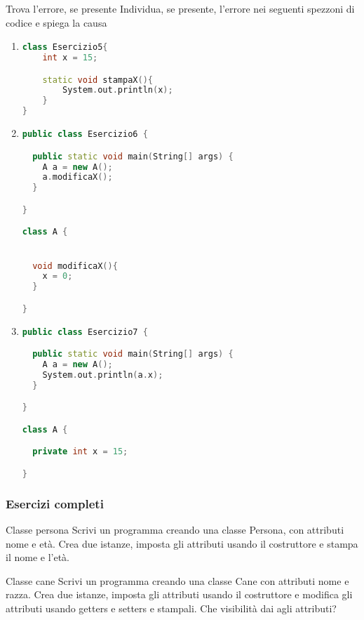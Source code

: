 \begin{esercizioL}{Trova l'errore, se presente}
	Individua, se presente, l'errore nei seguenti spezzoni di codice e spiega la causa
	\begin{enumerate}
		\item \quad
		      \begin{lstlisting}[language = c++, frame = none]
class Esercizio5{
    int x = 15;

    static void stampaX(){
        System.out.println(x);
    }
}
\end{lstlisting}
		\item \quad
		      \begin{lstlisting}[language = c++, frame = none]
public class Esercizio6 {

  public static void main(String[] args) {
    A a = new A();
    a.modificaX();
  }

}

class A {


  void modificaX(){
    x = 0;
  }

}
                \end{lstlisting}
		\item \quad
		      \begin{lstlisting}[language = c++, frame = none]
public class Esercizio7 {

  public static void main(String[] args) {
    A a = new A();
    System.out.println(a.x);
  }

}

class A {

  private int x = 15;

}
\end{lstlisting}

	\end{enumerate}
\end{esercizioL}

\subsubsection{Esercizi completi}

\begin{esercizio}{Classe persona}
	Scrivi un programma creando una classe {\ttfamily Persona}, con attributi {\ttfamily nome} e {\ttfamily età}. Crea due istanze, imposta gli attributi usando il costruttore e stampa il nome e l'età.

\end{esercizio}


\begin{esercizio}{Classe cane}
	Scrivi un programma creando una classe {\ttfamily Cane} con attributi {\ttfamily nome} e {\ttfamily razza}. Crea due istanze, imposta gli attributi usando il costruttore e modifica gli attributi usando getters e setters e stampali. Che visibilità dai agli attributi?

\end{esercizio}


